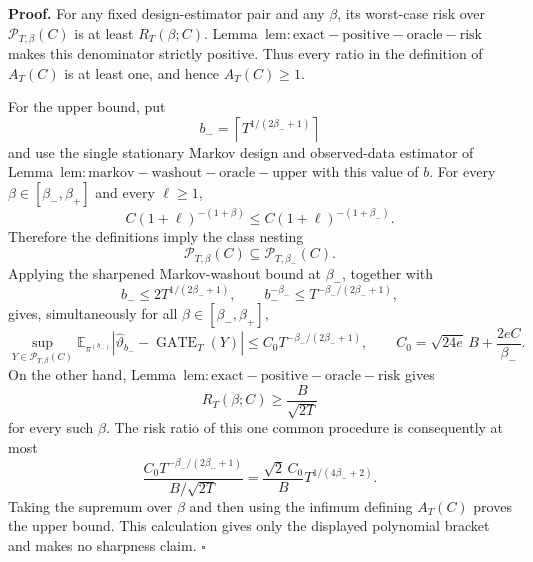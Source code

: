 \textbf{Proof.} For any fixed design-estimator pair and any \(\beta\), its worst-case risk over \(\mathcal P_{T,\beta}(C)\) is at least \(R_T(\beta;C)\). Lemma~\(\mathrm{lem:exact-positive-oracle-risk}\) makes this denominator strictly positive. Thus every ratio in the definition of \(A_T(C)\) is at least one, and hence \(A_T(C)\ge1\).

For the upper bound, put
\[
b_-=\left\lceil T^{1/(2\beta_-+1)}\right\rceil
\]
and use the single stationary Markov design and observed-data estimator of Lemma~\(\mathrm{lem:markov-washout-oracle-upper}\) with this value of \(b\). For every \(\beta\in[\beta_-,\beta_+]\) and every \(\ell\ge1\),
\[
C(1+\ell)^{-(1+\beta)}
\le C(1+\ell)^{-(1+\beta_-)}.
\]
Therefore the definitions imply the class nesting
\[
\mathcal P_{T,\beta}(C)\subseteq\mathcal P_{T,\beta_-}(C).
\]
Applying the sharpened Markov-washout bound at \(\beta_-\), together with
\[
b_-\le2T^{1/(2\beta_-+1)},
\qquad
b_-^{-\beta_-}\le T^{-\beta_-/(2\beta_-+1)},
\]
gives, simultaneously for all \(\beta\in[\beta_-,\beta_+]\),
\[
\sup_{Y\in\mathcal P_{T,\beta}(C)}
\mathbb E_{\pi^{(b_-)}}|\widehat\vartheta_{b_-}-\operatorname{GATE}_T(Y)|
\le C_0T^{-\beta_-/(2\beta_-+1)},
\qquad
C_0=\sqrt{24e}\,B+\frac{2eC}{\beta_-}.
\]
On the other hand, Lemma~\(\mathrm{lem:exact-positive-oracle-risk}\) gives
\[
R_T(\beta;C)\ge\frac{B}{\sqrt{2T}}
\]
for every such \(\beta\). The risk ratio of this one common procedure is consequently at most
\[
\frac{C_0T^{-\beta_-/(2\beta_-+1)}}{B/\sqrt{2T}}
=\frac{\sqrt2\,C_0}{B}T^{1/(4\beta_-+2)}.
\]
Taking the supremum over \(\beta\) and then using the infimum defining \(A_T(C)\) proves the upper bound. This calculation gives only the displayed polynomial bracket and makes no sharpness claim. \(\square\)
